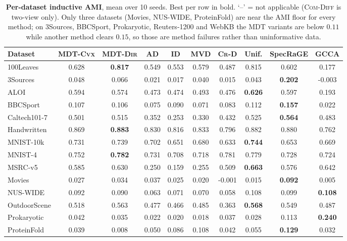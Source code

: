 \begin{table}[H]\centering\scriptsize
\caption{\textbf{Per-dataset inductive AMI}, mean over 10 seeds. Best per row in bold. `--' = not applicable (\textsc{Com-Diff} is two-view only). Only three datasets (Movies, NUS-WIDE, ProteinFold) are near the AMI floor for every method; on 3Sources, BBCSport, Prokaryotic, Reuters-1200 and WebKB the MDT variants are below $0.11$ while another method clears $0.15$, so those are method failures rather than uninformative data.}
\label{tab:oos-per-dataset}
\begin{tabular}{l c c c c c c c c c}
\toprule
Dataset & MDT-\textsc{Cvx} & MDT-\textsc{Dir} & AD & ID & MVD & \textsc{Cr-D} & Unif. & SpecRaGE & GCCA\\
\midrule
100Leaves & 0.628 & \textbf{0.817} & 0.549 & 0.553 & 0.579 & 0.487 & 0.815 & 0.602 & 0.177\\
3Sources & 0.048 & 0.066 & 0.021 & 0.017 & 0.040 & 0.015 & 0.043 & \textbf{0.202} & -0.003\\
ALOI & 0.594 & 0.574 & 0.473 & 0.474 & 0.493 & 0.476 & \textbf{0.626} & 0.597 & 0.193\\
BBCSport & 0.107 & 0.106 & 0.075 & 0.090 & 0.071 & 0.083 & 0.112 & \textbf{0.157} & 0.022\\
Caltech101-7 & 0.501 & 0.515 & 0.352 & 0.253 & 0.330 & 0.432 & 0.525 & \textbf{0.564} & 0.483\\
Handwritten & 0.869 & \textbf{0.883} & 0.830 & 0.816 & 0.833 & 0.796 & 0.882 & 0.880 & 0.762\\
MNIST-10k & 0.731 & 0.739 & 0.702 & 0.651 & 0.680 & 0.633 & \textbf{0.744} & 0.653 & 0.669\\
MNIST-4 & 0.752 & \textbf{0.782} & 0.731 & 0.708 & 0.718 & 0.781 & 0.779 & 0.728 & 0.724\\
MSRC-v5 & 0.585 & 0.630 & 0.250 & 0.159 & 0.255 & 0.509 & \textbf{0.663} & 0.576 & 0.642\\
Movies & 0.027 & 0.034 & 0.037 & 0.025 & 0.020 & -0.001 & 0.015 & \textbf{0.092} & 0.005\\
NUS-WIDE & 0.092 & 0.090 & 0.063 & 0.071 & 0.070 & 0.058 & 0.108 & 0.099 & \textbf{0.108}\\
OutdoorScene & 0.518 & 0.563 & 0.477 & 0.466 & 0.485 & 0.363 & \textbf{0.568} & 0.549 & 0.487\\
Prokaryotic & 0.042 & 0.035 & 0.022 & 0.020 & 0.018 & 0.037 & 0.028 & 0.113 & \textbf{0.240}\\
ProteinFold & 0.039 & 0.008 & 0.050 & 0.086 & 0.108 & 0.042 & 0.055 & \textbf{0.129} & 0.032\\

\end{tabular}
\end{table}
